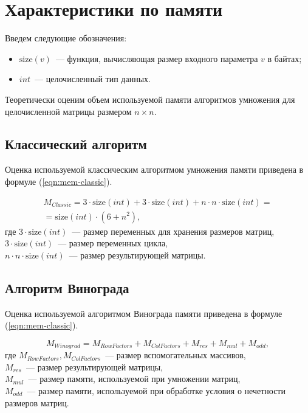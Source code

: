 \section{Характеристики по памяти}

Введем следующие обозначения:

\begin{itemize}
    \item $\text{size}(v)$~--- функция, вычисляющая размер входного параметра $v$ в байтах;
    \item $int$~--- целочисленный тип данных.
\end{itemize}

Теоретически оценим объем используемой памяти алгоритмов умножения для целочисленной матрицы размером $n \times n$.

\subsection{Классический алгоритм}

Оценка используемой классическим алгоритмом умножения памяти приведена в формуле (\ref{eqn:mem-classic}).

\begin{equation}
    \label{eqn:mem-classic}
    \begin{aligned}
        M_{Classic} = 3 \cdot \text{size}(int) + 3 \cdot \text{size}(int) + n \cdot n \cdot \text{size}(int) = \\
        = \text{size}(int) \cdot (6 + n^2),
    \end{aligned}    
\end{equation}
где $3 \cdot \text{size}(int)$~--- размер переменных для хранения размеров матриц,
\\ $3 \cdot \text{size}(int)$~--- размер переменных цикла,
\\ $n \cdot n \cdot \text{size}(int)$~--- размер результирующей матрицы.

\subsection{Алгоритм Винограда}

Оценка используемой алгоритмом Винограда памяти приведена в формуле (\ref{eqn:mem-classic}).

\begin{equation}
    M_{Winograd} = M_{RowFactors} + M_{ColFactors} + M_{res} + M_{mul} + M_{odd},
\end{equation}
где $M_{RowFactors}, M_{ColFactors}$~--- размер вспомогательных массивов,
\\ $M_{res}$~--- размер результирующей матрицы,
\\ $M_{mul}$~--- размер памяти, используемой при умножении матриц,
\\ $M_{odd}$~--- размер памяти, используемой при обработке условия о нечетности размеров матриц.

